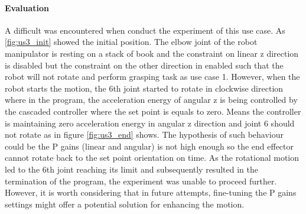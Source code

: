 \documentclass[report.tex]{subfiles}
\begin{document}
    \paragraph{\large{Evaluation}\\}
    A difficult was encountered when conduct the experiment of this use case. As \ref{fig:us3_init} showed the initial position. The elbow joint of the robot manipulator is resting on a stack of book and the constraint on linear z direction is disabled but the constraint on the other direction in enabled such that the robot will not rotate and perform grasping task as use case 1. However, when the robot starts the motion, the 6th joint started to rotate in clockwise direction where in the program, the acceleration energy of angular z is being controlled by the cascaded controller where the set point is equals to zero. Means the controller is maintaining zero acceleration energy in angular z direction and joint 6 should not rotate as in figure \ref{fig:us3_end} shows. The hypothesis of such behaviour could be the P gains (linear and angular) is not high enough so the end effector cannot rotate back to the set point orientation on time. As the rotational motion led to the 6th joint reaching its limit and subsequently resulted in the termination of the program, the experiment was unable to proceed further. However, it is worth considering that in future attempts, fine-tuning the P gains settings might offer a potential solution for enhancing the motion.
\end{document}
